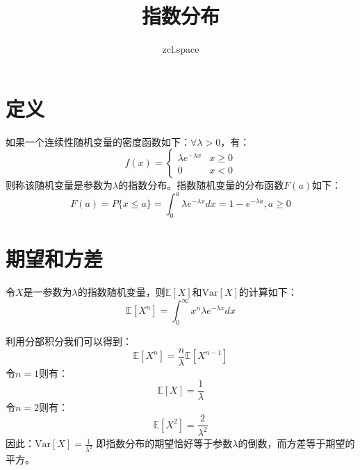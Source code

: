 \documentclass[10pt,a4paper,UTF8]{article}
\author{zcl.space}
\date{}
\title{指数分布}
\begin{document}
\maketitle
\tableofcontents
{}


\section{定义}
\label{sec:org894b3c5}


如果一个连续性随机变量的密度函数如下：\(\forall \lambda > 0\)，有：
\begin{equation}
\label{eq:1}
f(x) =
\begin{cases}
\lambda e^{-\lambda x} & x \geq 0 \\
0 & x < 0
\end{cases}
\end{equation}
则称该随机变量是参数为\(\lambda\)的指数分布。指数随机变量的分布函数\(F(a)\)如下：
\begin{equation}
\label{eq:2}
F(a) = P\{x \leq a\} = \int_{0}^{a}\lambda e^{-\lambda x}dx = 1 - e^{-\lambda a}, a\geq 0
\end{equation}
\section{期望和方差}
\label{sec:orgadd6b35}


令\(X\)是一参数为\(\lambda\)的指数随机变量，则\(\mathbb{E}[X]\)和\(\mathrm{Var}[X]\)的计算如下：
\begin{equation}
\label{eq:3}
\mathbb{E}[X^{n}] = \int_{0}^{\infty}x^{n}\lambda e^{-\lambda x}dx
\end{equation}

利用分部积分我们可以得到：
\begin{equation}
\label{eq:4}
\mathbb{E}[X^{n}] = \frac{n}{\lambda}\mathbb{E}[X^{n-1}]
\end{equation}
令\(n=1\)则有：
\begin{equation}
\label{eq:5}
\mathbb{E}[X] = \frac{1}{\lambda}
\end{equation}
令\(n=2\)则有：
\begin{equation}
\label{eq:6}
\mathbb{E}[X^{2}] = \frac{2}{\lambda^{2}}
\end{equation}
因此：\(\mathrm{Var}[X] = \frac{1}{\lambda^{2}}\)
即指数分布的期望恰好等于参数\(\lambda\)的倒数，而方差等于期望的平方。
\end{document}

